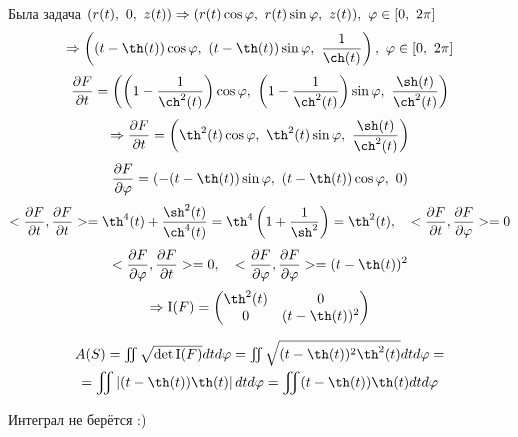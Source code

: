 \documentclass[main]{subfiles}
\begin{document}
    \begin{sol}
      Была задача $ (r(t),\ 0,\ z(t)) \Ra (r(t) \cos \varphi,\ r(t)\sin \varphi,\ z(t)),\ \varphi \in [0,\ 2\pi]$\\
      \[\Ra \Br{
        \Br{t - \th(t)}\cos \varphi,\
        \Br{t - \th(t)}\sin \varphi,\
        \dfrac{1}{\ch(t)}},\
      \varphi \in [0,\ 2\pi]\]
      \[\frac{\d F}{\d t} = \Br{
        \Br{1 - \frac{1}{\ch^2(t)}}\cos \varphi,\
        \Br{1 - \frac{1}{\ch^2(t)}}\sin \varphi,\
        \frac{\sh(t)}{\ch^2(t)}
      }\]
      \[\Ra \frac{\d F}{\d t} = \Br{
        \th^2 (t)\cos \varphi,\
        \th^2 (t)\sin \varphi,\
        \frac{\sh(t)}{\ch^2(t)}
      }\]
      \[\frac{\d F}{\d \varphi} = \Br{
        -(t-\th(t))\sin \varphi,\
        (t-\th(t))\cos \varphi,\
        0
      }\]
      \[<\frac{\d F}{\d t}, \frac{\d F}{\d t}> = \th^4 (t)+\frac{\sh^2 (t)}{\ch^4 (t)} = \th^4 \Br{1+\dfrac{1}{\sh^2}} =\th^2 (t),\q
      <\frac{\d F}{\d t}, \frac{\d F}{\d \varphi}> = 0\]
      \[<\frac{\d F}{\d \varphi}, \frac{\d F}{\d t}> = 0,\q
      <\frac{\d F}{\d \varphi}, \frac{\d F}{\d \varphi}> = (t-\th(t))^2 \]
      \[\Ra \RNumb{1}(F) =
      \begin{pmatrix}
        {}\th^2 (t) & 0\\
        0 & (t-\th(t))^2
      \end{pmatrix}\]

      \begin{multline*}
        $$A(S) = \iint \sqrt{\det \RNumb{1}(F)} dt d\varphi =
        \iint \sqrt{(t-\th(t))^2 \th^2 (t)} dt d\varphi =\\
        =\iint \abs{(t-\th(t)) \th (t)} dt d\varphi = \iint (t-\th(t)) \th (t) dt d\varphi$$
      \end{multline*}

      Интеграл не берётся :)


\end{sol}
\end{document}
